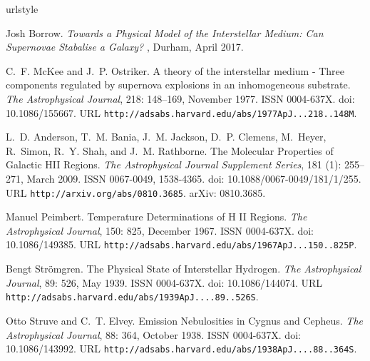 \begin{thebibliography}{8}
\providecommand{\natexlab}[1]{#1}
\providecommand{\url}[1]{\texttt{#1}}
\expandafter\ifx\csname urlstyle\endcsname\relax
  \providecommand{\doi}[1]{doi: #1}\else
  \providecommand{\doi}{doi: \begingroup \urlstyle{rm}\Url}\fi

Josh Borrow.
\newblock \emph{Towards a {Physical} {Model} of the {Interstellar} {Medium}:
  {Can} {Supernovae} {Stabalise} a {Galaxy}?}
, Durham, April 2017.

C.~F. McKee and J.~P. Ostriker.
\newblock A theory of the interstellar medium - {Three} components regulated by
  supernova explosions in an inhomogeneous substrate.
\newblock \emph{The Astrophysical Journal}, 218: 148--169, November
  1977.
\newblock ISSN 0004-637X.
\newblock \doi{10.1086/155667}.
\newblock URL \url{http://adsabs.harvard.edu/abs/1977ApJ...218..148M}.

L.~D. Anderson, T.~M. Bania, J.~M. Jackson, D.~P. Clemens, M.~Heyer, R.~Simon,
  R.~Y. Shah, and J.~M. Rathborne.
\newblock The {Molecular} {Properties} of {Galactic} {HII} {Regions}.
\newblock \emph{The Astrophysical Journal Supplement Series}, 181
  (1): 255--271, March 2009.
\newblock ISSN 0067-0049, 1538-4365.
\newblock \doi{10.1088/0067-0049/181/1/255}.
\newblock URL \url{http://arxiv.org/abs/0810.3685}.
\newblock arXiv: 0810.3685.

Manuel Peimbert.
\newblock Temperature {Determinations} of {H} {II} {Regions}.
\newblock \emph{The Astrophysical Journal}, 150: 825, December 1967.
\newblock ISSN 0004-637X.
\newblock \doi{10.1086/149385}.
\newblock URL \url{http://adsabs.harvard.edu/abs/1967ApJ...150..825P}.

Bengt Strömgren.
\newblock The {Physical} {State} of {Interstellar} {Hydrogen}.
\newblock \emph{The Astrophysical Journal}, 89: 526, May 1939.
\newblock ISSN 0004-637X.
\newblock \doi{10.1086/144074}.
\newblock URL \url{http://adsabs.harvard.edu/abs/1939ApJ....89..526S}.

Otto Struve and C.~T. Elvey.
\newblock Emission {Nebulosities} in {Cygnus} and {Cepheus}.
\newblock \emph{The Astrophysical Journal}, 88: 364, October 1938.
\newblock ISSN 0004-637X.
\newblock \doi{10.1086/143992}.
\newblock URL \url{http://adsabs.harvard.edu/abs/1938ApJ....88..364S}.


\end{thebibliography}
